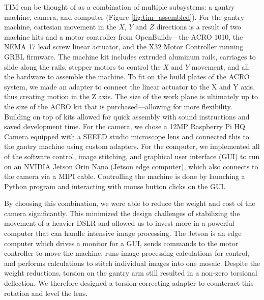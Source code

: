 \documentclass[a4paper,12pt]{article}
\begin{document}
TIM can be thought of as a combination of multiple subsystems: a gantry machine, camera, and computer (Figure \ref{fig:tim_assembled}). 
For the gantry machine, cartesian movement in the $X$, $Y$ and $Z$ directions is a result of two machine kits and a motor controller from OpenBuilds---the ACRO 1010, the NEMA 17 lead screw linear actuator, and the X32 Motor Controller running GRBL firmware. %
The machine kit includes extruded aluminum rails, carriages to slide along the rails, stepper motors to control the $X$ and $Y$ movement, and all the hardware to assemble the machine. 
To fit on the build plates of the ACRO system, we made an adapter to connect the linear actuator to the X and Y axis, thus creating motion in the Z axis.
The size of the work plane is ultimately up to the size of the ACRO kit that is purchased---allowing for more flexibility.
Building on top of kits allowed for quick assembly with sound instructions and saved development time. 
For the camera, we chose a 12MP Raspberry Pi HQ Camera equipped with a SEEED studio microscope lens and connected this to the gantry machine using custom adapters.
For the computer, we implemented all of the software control, image stitching, and graphical user interface (GUI) to run on an NVIDIA Jetson Orin Nano (Jetson edge computer), which also connects to the camera via a MIPI cable.  %
Controlling the machine is done by launching a Python program and interacting with mouse button clicks on the GUI. 

By choosing this combination, we were able to reduce the weight and cost of the camera significantly. This minimized the design challenges of stabilizing the movement of a heavier DSLR and allowed us to invest more in a powerful computer that can handle intensive image processing. 
The Jetson is an edge computer which drives a monitor for a GUI, sends commands to the motor controller to move the machine, runs image processing calculations for control, and performs calculations to stitch individual images into one mosaic. 
Despite the weight reductions, torsion on the gantry arm still resulted in a non-zero torsional deflection. We therefore designed a torsion correcting adapter to counteract this rotation and level the lens. %
\end{document}
